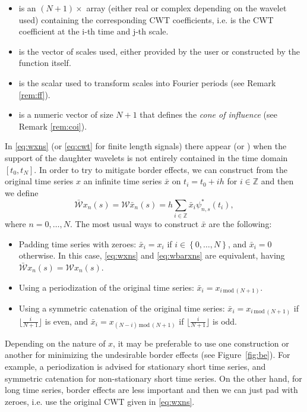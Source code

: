 \begin{itemize}
\item {} is an $(N+1)\times$ array (either real or complex depending on the wavelet used) containing the corresponding CWT coefficients, i.e.  is the CWT coefficient at the i-th time and j-th scale.
\item {} is the vector of scales used, either provided by the user or constructed by the function itself.
\item {} is the scalar used to transform scales into Fourier periods (see Remark \ref{rem:ff}).
\item {} is a numeric vector of size $N+1$ that defines the \emph{cone of influence} (see Remark \ref{rem:coi}).
\end{itemize}

\begin{rmk}
\label{rem:be}
In \eqref{eq:wxns} (or \eqref{eq:cwt} for finite length signals) there appear  (or ) when the support of the daughter wavelets is not entirely contained in the time domain $\left[ t_0,t_N\right] $. In order to try to mitigate border effects, we can construct from the original time series $x$ an infinite time series $\bar{x}$ on $t_i=t_0+ih$ for $i\in \mathbb{Z}$ and then we define
\begin{equation}
\label{eq:wbarxns}
\bar{\mathcal{W}}x_n(s)=\mathcal{W}\bar{x}_n(s)=h\sum _{i\in \mathbb{Z}} \bar{x}_i \psi _{n,s}^*\left( t_i\right) ,
\end{equation}
where $n=0,\ldots ,N$. The most usual ways to construct $\bar{x}$ are the following:
\begin{itemize}
\item Padding time series with zeroes: $\bar{x}_i=x_i$ if $i\in \left\{ 0,\ldots ,N\right\} $, and $\bar{x}_i=0$ otherwise. In this case, \eqref{eq:wxns} and \eqref{eq:wbarxns} are equivalent, having $\bar{\mathcal{W}}x_n(s)=\mathcal{W}x_n(s)$.
\item Using a periodization of the original time series: $\bar{x}_i=x_{i \,\textrm{mod}\,(N+1)}$.
\item Using a symmetric catenation of the original time series: $\bar{x}_i=x_{i \,\textrm{mod}\,(N+1)}$ if $\lfloor \frac{i}{N+1}\rfloor $ is even, and $\bar{x}_i=x_{(N-i) \,\textrm{mod}\,(N+1)}$ if $\lfloor \frac{i}{N+1}\rfloor $ is odd.
\end{itemize}

Depending on the nature of $x$, it may be preferable to use one construction or another for minimizing the undesirable border effects (see Figure~\ref{fig:be}). For example, a periodization is advised for stationary short time series, and symmetric catenation for non-stationary short time series. On the other hand, for long time series, border effects are less important and then we can just pad with zeroes, i.e. use the original CWT given in \eqref{eq:wxns}.
\end{rmk}

